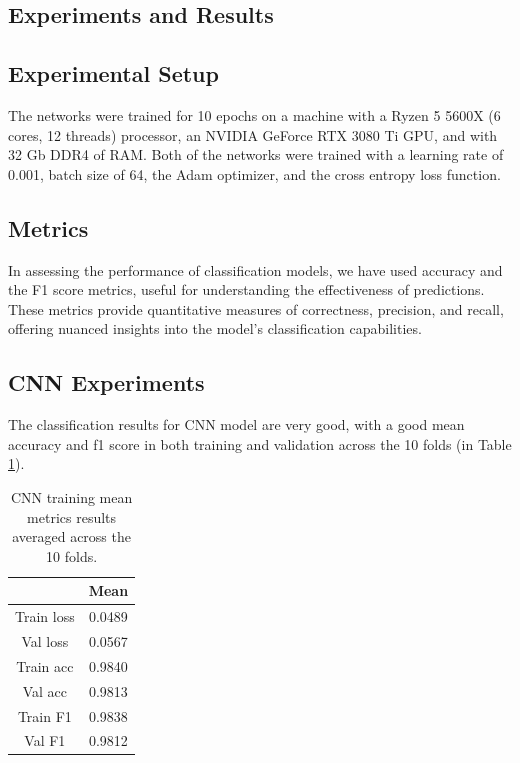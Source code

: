 \documentclass[11pt]{article}
\begin{document}
\begin{multicols*}{2}
\section{Experiments and Results}

\subsection{Experimental Setup}
The networks were trained for 10 epochs on a machine with a Ryzen 5 5600X (6 cores, 12 threads) processor, an NVIDIA GeForce RTX 3080 Ti GPU, and with 32 Gb DDR4 of RAM. Both of the networks were trained with a learning rate of 0.001, batch size of 64, the Adam optimizer, and the cross entropy loss function.

\subsection{Metrics}
In assessing the performance of classification models, we have used accuracy and the F1 score metrics, useful for understanding the effectiveness of predictions. These metrics provide quantitative measures of correctness, precision, and recall, offering nuanced insights into the model's classification capabilities.

\subsection{CNN Experiments}
The classification results for CNN model are very good, with a good mean accuracy and f1 score in both training and validation across the 10 folds (in Table \ref{tab:cnn_training_metrics}).

\begin{table}[H]
    \centering
    \begin{tabular}{|c|c|}
        \hline
         & Mean \\
        \hline
        Train loss & 0.0489 \\
        \hline
        Val loss & 0.0567 \\
        \hline
        Train acc & 0.9840 \\
        \hline
        Val acc & 0.9813 \\
        \hline
        Train F1 & 0.9838 \\
        \hline
        Val F1 & 0.9812 \\
        \hline
    \end{tabular}
    \caption{CNN training mean metrics results averaged across the 10 folds.}
    \label{tab:cnn_training_metrics}
\end{table}


\end{multicols*}
\end{document}
